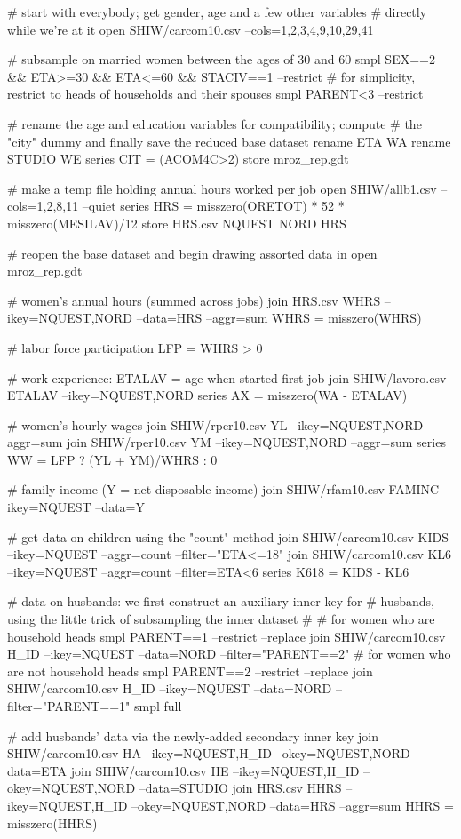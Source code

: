 \begin{code}
# start with everybody; get gender, age and a few other variables 
# directly while we're at it
open SHIW/carcom10.csv --cols=1,2,3,4,9,10,29,41

# subsample on married women between the ages of 30 and 60
smpl SEX==2 && ETA>=30 && ETA<=60 && STACIV==1 --restrict
# for simplicity, restrict to heads of households and their spouses
smpl PARENT<3  --restrict

# rename the age and education variables for compatibility; compute
# the "city" dummy and finally save the reduced base dataset
rename ETA WA
rename STUDIO WE
series CIT = (ACOM4C>2)
store mroz_rep.gdt

# make a temp file holding annual hours worked per job
open SHIW/allb1.csv --cols=1,2,8,11 --quiet
series HRS = misszero(ORETOT) * 52 * misszero(MESILAV)/12
store HRS.csv NQUEST NORD HRS

# reopen the base dataset and begin drawing assorted data in
open mroz_rep.gdt

# women's annual hours (summed across jobs) 
join HRS.csv WHRS --ikey=NQUEST,NORD --data=HRS --aggr=sum
WHRS = misszero(WHRS)

# labor force participation
LFP = WHRS > 0

# work experience: ETALAV = age when started first job
join SHIW/lavoro.csv ETALAV --ikey=NQUEST,NORD
series AX = misszero(WA - ETALAV)

# women's hourly wages
join SHIW/rper10.csv YL --ikey=NQUEST,NORD --aggr=sum
join SHIW/rper10.csv YM --ikey=NQUEST,NORD --aggr=sum
series WW = LFP ? (YL + YM)/WHRS : 0

# family income (Y = net disposable income)
join SHIW/rfam10.csv FAMINC --ikey=NQUEST --data=Y

# get data on children using the "count" method
join SHIW/carcom10.csv KIDS --ikey=NQUEST --aggr=count --filter="ETA<=18"
join SHIW/carcom10.csv KL6 --ikey=NQUEST --aggr=count --filter=ETA<6
series K618 = KIDS - KL6

# data on husbands: we first construct an auxiliary inner key for 
# husbands, using the little trick of subsampling the inner dataset
#
# for women who are household heads
smpl PARENT==1 --restrict --replace
join SHIW/carcom10.csv H_ID --ikey=NQUEST --data=NORD --filter="PARENT==2"
# for women who are not household heads
smpl PARENT==2 --restrict --replace
join SHIW/carcom10.csv H_ID --ikey=NQUEST --data=NORD --filter="PARENT==1"
smpl full

# add husbands' data via the newly-added secondary inner key
join SHIW/carcom10.csv HA --ikey=NQUEST,H_ID --okey=NQUEST,NORD --data=ETA
join SHIW/carcom10.csv HE --ikey=NQUEST,H_ID --okey=NQUEST,NORD --data=STUDIO
join HRS.csv HHRS --ikey=NQUEST,H_ID --okey=NQUEST,NORD --data=HRS --aggr=sum
HHRS = misszero(HHRS)


\end{code}
